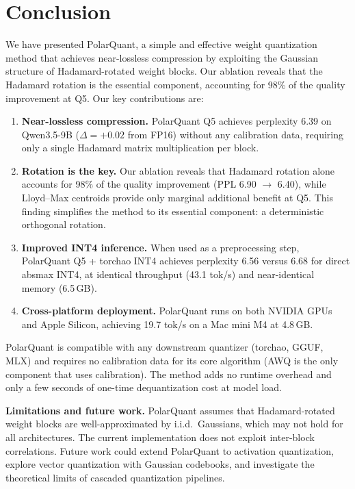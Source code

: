\documentclass[10pt,twocolumn]{article}
\begin{document}
\section{Conclusion}
\label{sec:conclusion}

We have presented PolarQuant, a simple and effective weight quantization method that achieves near-lossless compression by exploiting the Gaussian structure of Hadamard-rotated weight blocks. Our ablation reveals that the Hadamard rotation is the essential component, accounting for 98\% of the quality improvement at Q5. Our key contributions are:

\begin{enumerate}[leftmargin=*,itemsep=2pt]
  \item \textbf{Near-lossless compression.} PolarQuant Q5 achieves perplexity 6.39 on Qwen3.5-9B ($\Delta = +0.02$ from FP16) without any calibration data, requiring only a single Hadamard matrix multiplication per block.
  \item \textbf{Rotation is the key.} Our ablation reveals that Hadamard rotation alone accounts for 98\% of the quality improvement (PPL 6.90 $\to$ 6.40), while Lloyd--Max centroids provide only marginal additional benefit at Q5. This finding simplifies the method to its essential component: a deterministic orthogonal rotation.
  \item \textbf{Improved INT4 inference.} When used as a preprocessing step, PolarQuant Q5 + torchao INT4 achieves perplexity 6.56 versus 6.68 for direct absmax INT4, at identical throughput (43.1 tok/s) and near-identical memory (6.5\,GB).
  \item \textbf{Cross-platform deployment.} PolarQuant runs on both NVIDIA GPUs and Apple Silicon, achieving 19.7 tok/s on a Mac mini M4 at 4.8\,GB.
\end{enumerate}

PolarQuant is compatible with any downstream quantizer (torchao, GGUF, MLX) and requires no calibration data for its core algorithm (AWQ is the only component that uses calibration). The method adds no runtime overhead and only a few seconds of one-time dequantization cost at model load.

\textbf{Limitations and future work.} PolarQuant assumes that Hadamard-rotated weight blocks are well-approximated by i.i.d.\ Gaussians, which may not hold for all architectures. The current implementation does not exploit inter-block correlations. Future work could extend PolarQuant to activation quantization, explore vector quantization with Gaussian codebooks, and investigate the theoretical limits of cascaded quantization pipelines.
\end{document}
